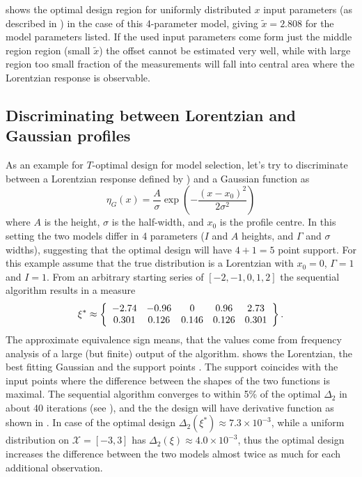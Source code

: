 \documentclass[12pt]{iopart}
\begin{document}
 shows the optimal design region for uniformly distributed $x$ input parameters (as described in ) in the case of this 4-parameter model, giving $\tilde x = 2.808$ for the model parameters listed. If the used input parameters come form just the middle region region (small $\tilde x$) the offset cannot be estimated very well, while with large region too small fraction of the measurements will fall into central area where the Lorentzian response is observable.

\subsection{Discriminating between Lorentzian and Gaussian profiles}

As an example for $T$-optimal design for model selection, let's try to discriminate between a Lorentzian response defined by ) and a Gaussian function as
\begin{equation}
\eta_G(x) = \frac{A}{\sigma} \exp\left(-\frac{(x-x_0)^2}{2 \sigma^2}\right)
\label{eq:gauss}
\end{equation}
where $A$ is the height, $\sigma$ is the half-width, and $x_0$ is the profile centre. In this setting the two models differ in 4 parameters ($I$ and $A$ heights, and $\Gamma$ and $\sigma$ widths), suggesting that the optimal design will have $4+1=5$ point support. For this example assume that the true distribution is a Lorentzian with $x_0 = 0$, $\Gamma = 1$  and $I = 1$. From an arbitrary starting series of $[-2, -1, 0, 1, 2]$ the sequential algorithm results in a measure
\begin{equation}
\xi^* \approx \left\{
  \begin{array}{c c c c c}
    -2.74 & -0.96 & 0 & 0.96 & 2.73\\
    0.301 & 0.126 & 0.146 & 0.126 & 0.301\\
  \end{array} \right \}.
\label{eq:lorgauss}
\end{equation}
The approximate equivalence sign means, that the values come from frequency analysis of a large (but finite) output of the algorithm.  shows the Lorentzian, the best fitting Gaussian and the support points . The support coincides with the input points where the difference between the shapes of  the two functions is maximal. The sequential algorithm converges to within 5\% of the optimal $\Delta_2$ in about 40  iterations (see ), and the the design will have derivative function as shown in .
In case of the optimal design $\Delta_2(\xi^*) \approx 7.3 \times 10^{-3}$, while a uniform distribution on $\mathcal{X} = [-3, 3]$ has $\Delta_2(\xi) \approx 4.0 \times 10^{-3}$, thus the optimal design increases the difference between the two models almost twice as much for each additional observation.
\end{document}

